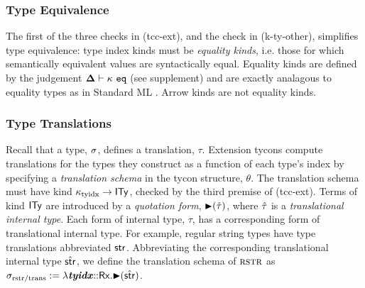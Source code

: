 \subsubsection{Type Equivalence}\label{sec:type-equivalence}
\noindent The first of the three checks in (tcc-ext), and the check in (k-ty-other),  simplifies type equivalence: type index kinds must be \emph{equality kinds}, i.e. those for which semantically equivalent values are syntactically equal. Equality kinds are defined by the judgement $\boldsymbol\Delta \vdash \kappa~\mathtt{eq}$ (see supplement) and are exactly analagous to equality types as in Standard ML \cite{Tofte:89:TheDefinitionOfStandardML}. Arrow kinds are not equality kinds.

\subsubsection{Type Translations}\label{sec:type-translations}

\noindent 
Recall that a type, $\sigma$, defines a translation, $\tau$. Extension tycons {compute} translations for the types they construct as a function of each type's index by specifying a \emph{translation schema} in the {tycon structure}, $\theta$. The translation schema must have kind $\kappa_\text{tyidx} \rightarrow {\sf ITy}$, checked by the third premise of (tcc-ext). Terms of kind ${\sf ITy}$ are introduced by a \emph{quotation form}, ${\blacktriangleright}(\hat{\tau})$, where $\hat{\tau}$ is a \emph{translational internal type}. Each form of internal type, $\tau$,  has a corresponding form of translational internal type. For example, regular string types have type translations abbreviated ${\sf str}$. Abbreviating the corresponding translational internal type $\hat{{\sf str}}$, we define the translation schema of $\textsc{rstr}$ as $\sigma_\text{rstr/trans} := \lambda {\textbf{\textit{tyidx}}}{::}{\sf Rx}.{\blacktriangleright}(\hat{{\sf str}})$. 




